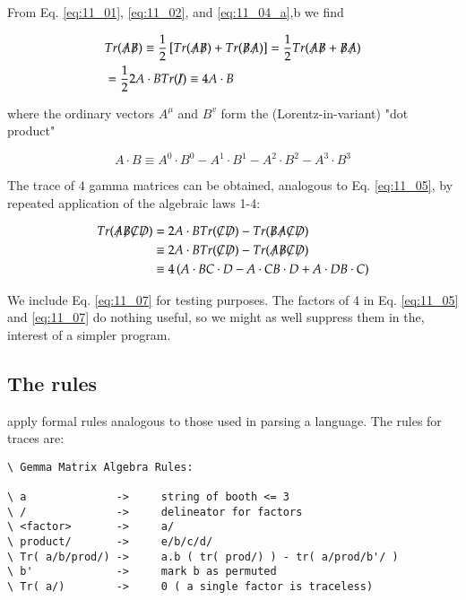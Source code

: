 From Eq. \eqref{eq:11_01}, \eqref{eq:11_02}, and \eqref{eq:11_04_a},b we find

\begin{align}\label{eq:11_05}
    & Tr(\tr{A} \tr{B}) \equiv \frac{1}{2} \left[ Tr(\tr{A} \tr{B}) + Tr(\tr{B} \tr{A}) \right] = \frac{1}{2} Tr(\tr{A} \tr{B} + \tr{B} \tr{A}) \nonumber \\
    & = \frac{1}{2} 2 A \cdot B \Tr{I} \equiv 4 A \cdot B
\end{align}

where the ordinary vectors $A^{\mu}$ and $B^{v}$ form the (Lorentz-in-variant) "dot product"

\begin{equation}\label{eq:11_06}
A \cdot B \equiv A^{0} \cdot B^{0} - A^{1} \cdot B^{1} - A^{2} \cdot B^{2} - A^{3} \cdot B^{3}
\end{equation}

The trace of 4 gamma matrices can be obtained, analogous to Eq. \eqref{eq:11_05}, by repeated application of the algebraic laws 1-4:

\begin{align}\label{eq:11_07}
Tr(\tr{A}\tr{B}\tr{C}\tr{D}) & = 2A\cdot B Tr(\tr{C}\tr{D}) - Tr(\tr{B}\tr{A}\tr{C}\tr{D}) \nonumber \\
& \equiv 2 A\cdot B Tr(\tr{C}\tr{D}) - Tr(\tr{A}\tr{B}\tr{C}\tr{D}) \\
& \equiv 4 \left(A\cdot B C \cdot D - A\cdot C B\cdot D + A\cdot D B \cdot C \right) \nonumber 
\end{align}

We include Eq. \eqref{eq:11_07} for testing purposes. The factors of 4 in Eq. \eqref{eq:11_05} and \eqref{eq:11_07} do nothing useful, so we might as well suppress them in the, interest of a simpler program.

\subsection{The rules}
 apply formal rules analogous to those used in parsing a language. The rules for traces are:

\begin{verbatim}
\ Gemma Matrix Algebra Rules:

\ a              ->     string of booth <= 3
\ /              ->     delineator for factors
\ <factor>       ->     a/
\ product/       ->     e/b/c/d/
\ Tr( a/b/prod/) ->     a.b ( tr( prod/) ) - tr( a/prod/b'/ )
\ b'             ->     mark b as permuted
\ Tr( a/)        ->     0 ( a single factor is traceless)
\end{verbatim}

